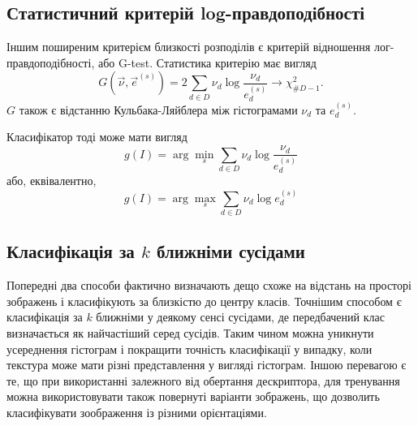 \subsection{Статистичний критерій log-правдоподібності}\label{section1.3b}\hfill

Іншим поширеним критерієм близкості розподілів є критерій відношення лог-правдоподібності, або G-test.
Статистика критерію має вигляд 
\begin{equation}\label{e:gtest-1}
    G(\vec \nu,\vec e^{(s)}) = 2\sum_{d \in D} \nu_d \log \frac{\nu_d}{e^{(s)}_d} \longrightarrow \chi^2_{\# D - 1}.
\end{equation}
$G$ також є відстанню Кульбака-Ляйблера між гістограмами $\nu_d$ та $e^{(s)}_d$. 


Класифікатор тоді може мати вигляд
\begin{equation*}\label{e:gtest-classifier-1}
    g(I) = \arg \min_s  \sum_{d \in D} \nu_d \log \frac{\nu_d}{e^{(s)}_d}
\end{equation*}
або, еквівалентно,\begin{equation*}\label{e:gtest-classifier-2}
    g(I) = \arg \max_s  \sum_{d \in D} \nu_d \log e^{(s)}_d
\end{equation*}

\subsection{Класифікація за $k$ ближніми сусідами}\label{section1.3c}

Попередні два способи фактично визначають дещо схоже на відстань на просторі зображень і класифікують за близкістю до центру класів.
Точнішим способом є класифікація за $k$ ближніми у деякому сенсі сусідами, де передбачений клас визначається як найчастіший серед сусідів.
Таким чином можна уникнути усереднення гістограм і покращити точність класифікації у випадку, коли текстура може мати різні представлення у вигляді гістограм.
Іншою перевагою є те, що при використанні залежного від обертання дескриптора, для тренування можна використовувати також повернуті варіанти зображень, що дозволить класифікувати зоображення із різними орієнтаціями.



